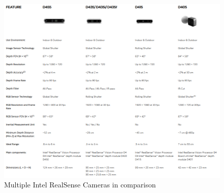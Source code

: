 \begin{figure}[h]
    \centering
    \includegraphics[width=\linewidth]{figures/IntelRealSense/IntelRealsense_cameras.png}
    \caption{Multiple Intel RealSense Cameras in comparison}
    \label{fig:realsense_cameras}
\end{figure}